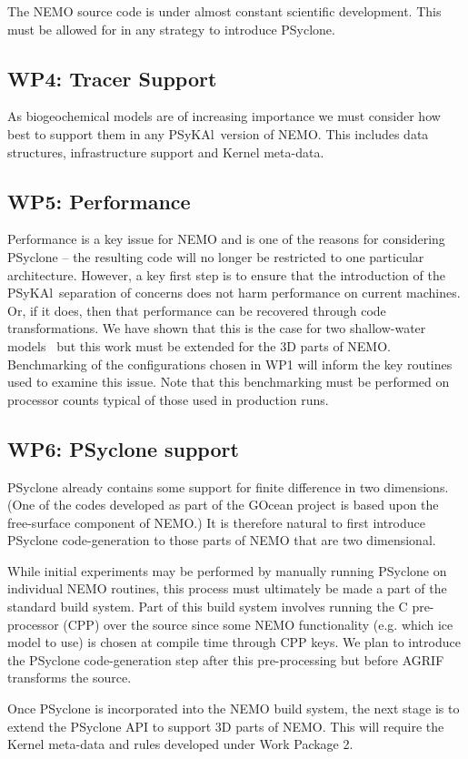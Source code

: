 \documentclass{article}
\newcommand{\psykal}{{PS}y{KA}l}
\begin{document}
The NEMO source code is under almost constant scientific
development. This must be allowed for in any strategy to introduce
PSyclone.

\subsection{WP4: Tracer Support}
\label{wp4_tracers}

As biogeochemical models are of increasing importance we must consider
how best to support them in any \psykal\ version of NEMO. This
includes data structures, infrastructure support and Kernel meta-data.

\subsection{WP5: Performance}
\label{wp5_perf}

Performance is a key issue for NEMO and is one of the reasons for
considering PSyclone -- the resulting code will no longer be
restricted to one particular architecture. However, a key first step
is to ensure that the introduction of the \psykal\ separation of
concerns does not harm performance on current machines. Or, if it
does, then that performance can be recovered through code
transformations. We have shown that this is the case for two
shallow-water models~\cite{XXX} but this work must be extended for the
3D parts of NEMO. Benchmarking of the configurations chosen in WP1
will inform the key routines used to examine this issue. Note that
this benchmarking must be performed on processor counts typical of
those used in production runs.

\subsection{WP6: PSyclone support}
\label{wp6_autogen}

PSyclone already contains some support for finite difference in two
dimensions.  (One of the codes developed as part of the GOcean project
is based upon the free-surface component of NEMO.) It is therefore
natural to first introduce PSyclone code-generation to those parts of NEMO
that are two dimensional.

While initial experiments may be performed by manually running
PSyclone on individual NEMO routines, this process must ultimately be
made a part of the standard build system. Part of this build system
involves running the C pre-processor (CPP) over the source since some
NEMO functionality (e.g. which ice model to use) is chosen at compile
time through CPP keys. We plan to introduce the PSyclone
code-generation step after this pre-processing but before AGRIF
transforms the source.

Once PSyclone is incorporated into the NEMO build system, the next
stage is to extend the PSyclone API to support 3D parts of NEMO.  This
will require the Kernel meta-data and rules developed under Work
Package 2.
\end{document}
